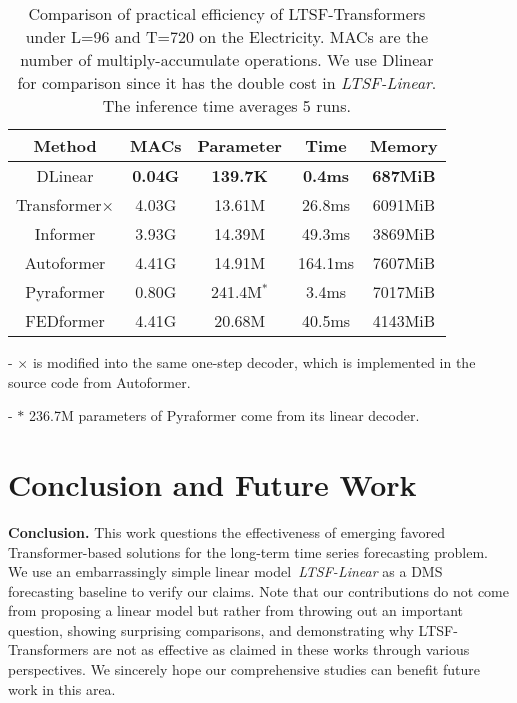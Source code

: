 \documentclass[10pt,twocolumn,letterpaper]{article}
\newcommand{\modelname}{\emph{LTSF-Linear}\xspace}
\begin{document}
\begin{table}[h]
\vspace{-0.1cm}
        \centering
        \scalebox{0.9}
{
        	{\begin{tabular}{c|cccc} \hline
                Method      & MACs & Parameter & Time & Memory\\\hline
                DLinear  & \textbf{0.04G}   & \textbf{139.7K}    & \textbf{0.4ms}     &\textbf{687MiB}        \\\hline
                Transformer$\times$ & 4.03G   & 13.61M     & 26.8ms     &6091MiB \\
                Informer    & 3.93G   & 14.39M     & 49.3ms     &3869MiB        \\
                Autoformer  & 4.41G   & 14.91M     & 164.1ms     &7607MiB        \\
                Pyraformer & 0.80G    &  241.4M$^*$   & 3.4ms     &7017MiB          \\
                FEDformer   & 4.41G   & 20.68M     & 40.5ms     &4143MiB \\\hline       
\end{tabular}}
            }
            \begin{tablenotes}
            \tiny
            {
            \item - $\times$ is modified into the same one-step decoder, which is implemented in the source code from Autoformer.
            \item - $*$ 236.7M parameters of Pyraformer come from its linear decoder. 
            }
            \end{tablenotes} \vspace{-0.2cm}
        \caption{Comparison of practical efficiency of LTSF-Transformers under L=96 and T=720 on the Electricity. MACs are the number of multiply-accumulate operations. We use Dlinear for comparison since it has the double cost in \modelname. The inference time averages 5 runs.}
\label{tab:efficiency}
\vspace{-0.3cm}
\end{table}




 \vspace{-0.4cm}
\section{Conclusion and Future Work}
\label{sec:conclusion}
\textbf{Conclusion.}
This work questions the effectiveness of emerging favored Transformer-based solutions for the long-term time series forecasting problem. We use an embarrassingly simple linear model~\modelname as a DMS forecasting baseline to verify our claims. Note that our contributions do not come from proposing a linear model but rather from throwing out an important question, showing surprising comparisons, and demonstrating why LTSF-Transformers are not as effective as claimed in these works through various perspectives.
We sincerely hope our comprehensive studies can benefit future work in this area.
\end{document}

